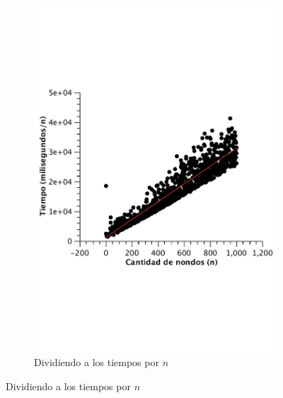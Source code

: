 \begin{figure}[H]
        \begin{subfigure}[b]{0.5\textwidth}
                \includegraphics[width=\textwidth]{imagenes/completo-matriz-2.pdf}
                \caption{Dividiendo a los tiempos por $n$}
        \end{subfigure}

\end{figure}

